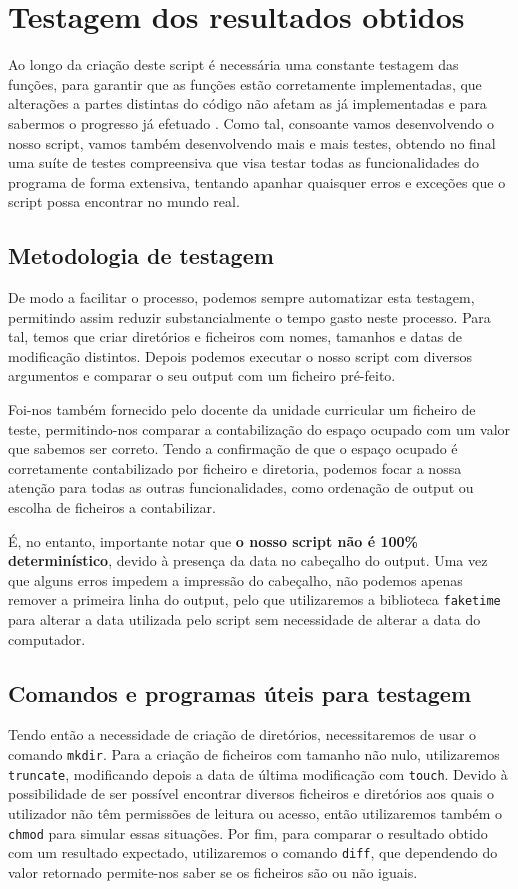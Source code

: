 \chapter{Testagem dos resultados obtidos}
Ao longo da criação deste script é necessária uma constante
testagem das funções, para garantir que as funções estão
corretamente implementadas, que alterações a partes
distintas do código não afetam as já implementadas e para
sabermos o progresso já efetuado \cite{george2004structured}. Como tal, consoante vamos
desenvolvendo o nosso script, vamos também desenvolvendo mais e
mais testes, obtendo no final uma suíte de testes compreensiva
que visa testar todas as funcionalidades do programa de forma
extensiva, tentando apanhar quaisquer erros e exceções que o
script possa encontrar no mundo real.

\section{Metodologia de testagem}
De modo a facilitar o processo, podemos
sempre automatizar esta testagem, permitindo assim reduzir
substancialmente o tempo gasto neste processo.
Para tal, temos que criar diretórios e ficheiros com nomes,
tamanhos e datas de modificação distintos. Depois podemos
executar o nosso script com diversos argumentos e comparar o
seu output com um ficheiro pré-feito.

Foi-nos também fornecido pelo docente da unidade
curricular um ficheiro de teste, permitindo-nos comparar a 
contabilização do espaço ocupado com um valor que sabemos ser 
correto. Tendo a confirmação de que o espaço ocupado é
corretamente contabilizado por ficheiro e diretoria, podemos
focar a nossa atenção para todas as outras funcionalidades, como ordenação de output ou escolha de ficheiros a
contabilizar.

É, no entanto, importante notar que \textbf{o nosso script não é 100\%
determinístico}, devido à presença da data no cabeçalho do
output. Uma vez que alguns erros impedem a impressão do
cabeçalho, não podemos apenas remover a primeira linha do
output, pelo que utilizaremos a biblioteca \verb|faketime| para
alterar a data utilizada pelo script sem necessidade de alterar
a data do computador.

\section{Comandos e programas úteis para testagem}
Tendo então a necessidade de criação de diretórios,
necessitaremos de usar o comando \verb|mkdir|. Para a
criação de ficheiros com tamanho não nulo,
utilizaremos \verb|truncate|, modificando depois a data de
última modificação com \verb|touch|. Devido à possibilidade de
ser possível encontrar diversos ficheiros e diretórios aos
quais o utilizador não têm permissões de leitura ou acesso,
então utilizaremos também o \verb|chmod| para simular essas
situações. Por fim, para comparar o resultado obtido com um 
resultado expectado, utilizaremos o comando \verb|diff|, 
que dependendo do valor retornado permite-nos saber se os
ficheiros são ou não iguais.

